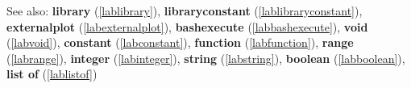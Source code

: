 See also: \textbf{library} (\ref{lablibrary}), \textbf{libraryconstant} (\ref{lablibraryconstant}), \textbf{externalplot} (\ref{labexternalplot}), \textbf{bashexecute} (\ref{labbashexecute}), \textbf{void} (\ref{labvoid}), \textbf{constant} (\ref{labconstant}), \textbf{function} (\ref{labfunction}), \textbf{range} (\ref{labrange}), \textbf{integer} (\ref{labinteger}), \textbf{string} (\ref{labstring}), \textbf{boolean} (\ref{labboolean}), \textbf{list of} (\ref{lablistof})
